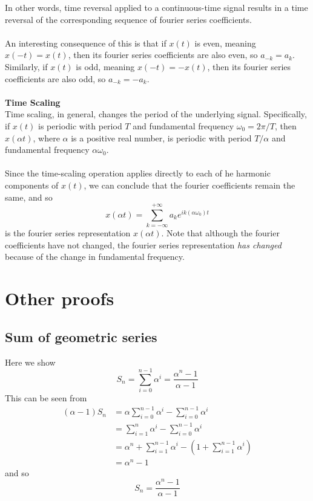 \documentclass{report}
\begin{document}
In other words, time reversal applied to a continuous-time signal results in a time reversal of the corresponding sequence of fourier series coefficients.\\
\vspace{1mm}\\
An interesting consequence of this is that
if $x(t)$ is even, meaning $x(-t)=x(t)$, then its fourier series coefficients are also even, so
$a_{-k}=a_k$. Similarly, if $x(t)$ is odd, meaning $x(-t)=-x(t)$, then its fourier series coefficients are also odd, so $a_{-k}=-a_k$.\\
\vspace{1mm}\\
\textbf{Time Scaling}\\
Time scaling, in general, changes the period of the underlying signal.
Specifically, if $x(t)$ is periodic with period $T$ and fundamental frequency $\omega_0=2\pi/T$, then
$x(\alpha t)$, where $\alpha$ is a positive real number, is periodic with period $T/\alpha$ and fundamental frequency $\alpha\omega_0$.\\
\vspace{1mm}\\
Since the time-scaling operation applies directly to each of he harmonic components of $x(t)$, we can conclude that the fourier coefficients remain the same, and so
\begin{equation*}
x(\alpha t)=\sum^{+\infty}_{k=-\infty}a_ke^{ik(\alpha\omega_0)t}
\end{equation*}
is the fourier series representation $x(\alpha t)$. Note that although the fourier coefficients have not changed, the fourier series representation \textit{has changed} because of the change
in fundamental frequency.











\appendix
\chapter{Other proofs}
\section{Sum of geometric series}
Here we show
\begin{equation*}
S_n=\sum^{n-1}_{i=0}\alpha^i=\frac{\alpha^n-1}{\alpha-1}
\end{equation*}
This can be seen from
\begin{align*}
(\alpha-1)S_n&=\alpha\sum^{n-1}_{i=0}\alpha^i-\sum^{n-1}_{i=0}\alpha^i\\
&=\sum^{n}_{i=1}\alpha^i-\sum^{n-1}_{i=0}\alpha^i\\
&=\alpha^n+\sum^{n-1}_{i=1}\alpha^i-(1+\sum^{n-1}_{i=1}\alpha^i)\\
&=\alpha^n-1
\end{align*}
and so
\begin{equation*}
S_n=\frac{\alpha^n-1}{\alpha-1}
\end{equation*}
\end{document}

